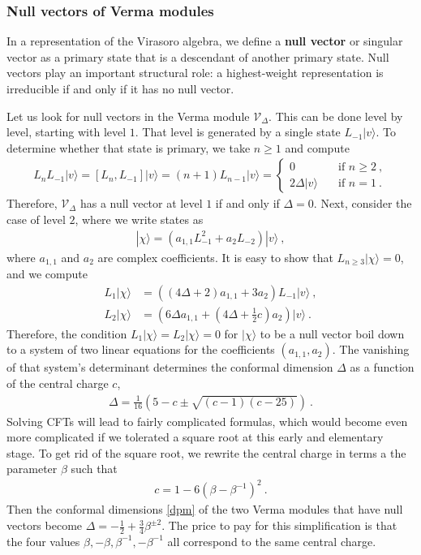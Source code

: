 \documentclass[12pt, a4paper]{article}
\theoremstyle{break}
\begin{document}
\subsubsection{Null vectors of Verma modules}

In a representation of the Virasoro algebra, we define a \textbf{null vector} or singular vector as a primary state that is a descendant of another primary state. Null vectors play an important structural role: a highest-weight representation is irreducible if and only if it has no null vector. 

Let us look for null vectors in the Verma module $\mathcal{V}_\Delta$. This can be done level by level, starting with level $1$. That level is generated by a single state $L_{-1}|v\rangle$. To determine whether that state is primary, we take $n\geq 1$ and compute 
\begin{align}
L_n L_{-1}|v\rangle = [L_n, L_{-1}] |v\rangle = (n+1) L_{n-1}|v\rangle = 
\left\{\begin{array}{ll} 0 &  \quad \text{if } n\geq 2\ , \\ 2\Delta |v\rangle & \quad \text{if } n = 1\ . \end{array}\right. 
\end{align}
Therefore, $\mathcal{V}_\Delta$ has a null vector at level $1$ if and only if $\Delta=0$. Next, consider the case of level $2$, where we write states as 
\begin{align}
 |\chi\rangle = \left(a_{1,1} L_{-1}^2 + a_2 L_{-2}\right) |v\rangle\ ,
\end{align}
where $a_{1,1}$ and $a_2$ are complex coefficients. It is easy to show that $L_{n\geq 3}|\chi\rangle=0$, and we compute 
\begin{align}
 L_1|\chi\rangle &= \left((4\Delta+2)a_{1,1} + 3a_2\right) L_{-1}|v\rangle\ ,
\\
L_2 |\chi \rangle &= \left(6\Delta a_{1,1}+(4\Delta+\tfrac12 c) a_2\right)|v\rangle\ .
\end{align}
Therefore, the condition $L_1|\chi\rangle=L_2 |\chi \rangle=0$ for $|\chi\rangle$ to be a null vector boil down to a system of two linear equations for the coefficients $(a_{1,1},a_2)$. The vanishing of that system's determinant determines the conformal dimension $\Delta$ as a function of the central charge $c$,
\begin{align}
 \Delta = \frac{1}{16}\left( 5-c\pm\sqrt{(c-1)(c-25)} \right) \ .
 \label{dpm}
\end{align}
Solving CFTs will lead to fairly complicated formulas, which would become even more complicated if we tolerated a square root at this early and elementary stage.
To get rid of the square root, we rewrite the central charge in terms a the parameter $\beta$ such that 
\begin{align}
 \boxed{c = 1- 6\left(\beta - \beta^{-1}\right)^2 } \ .
\end{align}
Then the conformal dimensions \eqref{dpm} of the two Verma modules that have null vectors become 
$
 \Delta = -\frac12 + \frac34\beta^{\pm 2}
$. The price to pay for this simplification is that the four values $\beta,-\beta,\beta^{-1},-\beta^{-1}$ all correspond to the same central charge. 
\end{document}
